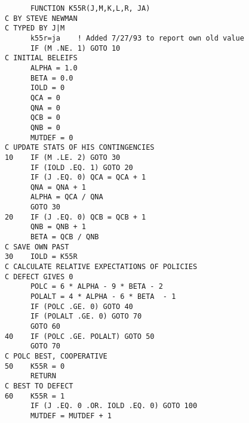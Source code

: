 \blankscreen{}
\begin{frame}[fragile]
    \centering
    \begin{verbatim}
            FUNCTION K55R(J,M,K,L,R, JA)
      C BY STEVE NEWMAN
      C TYPED BY J|M
            k55r=ja    ! Added 7/27/93 to report own old value
            IF (M .NE. 1) GOTO 10
      C INITIAL BELEIFS
            ALPHA = 1.0
            BETA = 0.0
            IOLD = 0
            QCA = 0
            QNA = 0
            QCB = 0
            QNB = 0
            MUTDEF = 0
      C UPDATE STATS OF HIS CONTINGENCIES
      10    IF (M .LE. 2) GOTO 30
            IF (IOLD .EQ. 1) GOTO 20
            IF (J .EQ. 0) QCA = QCA + 1
            QNA = QNA + 1
            ALPHA = QCA / QNA
            GOTO 30
      20    IF (J .EQ. 0) QCB = QCB + 1
            QNB = QNB + 1
            BETA = QCB / QNB
      C SAVE OWN PAST
      30    IOLD = K55R
      C CALCULATE RELATIVE EXPECTATIONS OF POLICIES
      C DEFECT GIVES 0
            POLC = 6 * ALPHA - 9 * BETA - 2
            POLALT = 4 * ALPHA - 6 * BETA  - 1
            IF (POLC .GE. 0) GOTO 40
            IF (POLALT .GE. 0) GOTO 70
            GOTO 60
      40    IF (POLC .GE. POLALT) GOTO 50
            GOTO 70
      C POLC BEST, COOPERATIVE
      50    K55R = 0
            RETURN
      C BEST TO DEFECT
      60    K55R = 1
            IF (J .EQ. 0 .OR. IOLD .EQ. 0) GOTO 100
            MUTDEF = MUTDEF + 1
            IF (MUTDEF .GT. 3) GOTO 110
            RETURN
      110   K55R = 0
            RETURN
      100   MUTDEF = 0
            RETURN
      C POLALT BEST, ALTERNATE C AND D
      70    K55R = 1 - K55R
            RETURN
            END
      \end{verbatim}
\end{frame}
